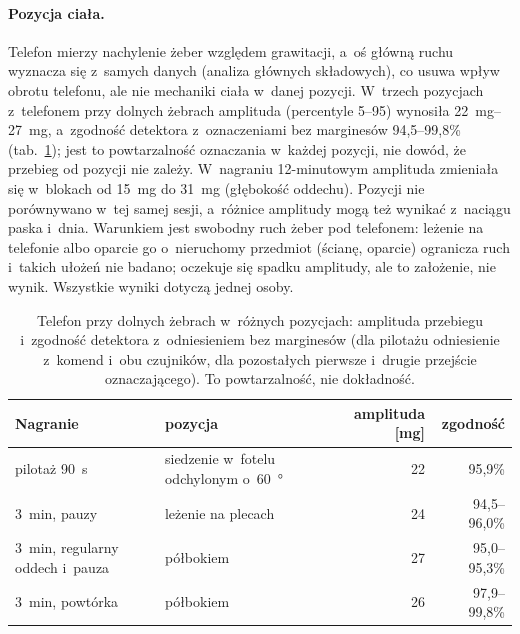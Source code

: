 \documentclass[12pt,a4paper,oneside]{report}
\begin{document}
\paragraph{Pozycja ciała.} Telefon mierzy nachylenie żeber względem grawitacji, a~oś główną ruchu
wyznacza się z~samych danych (analiza głównych składowych), co usuwa wpływ obrotu telefonu, ale nie
mechaniki ciała w~danej pozycji. W~trzech pozycjach z~telefonem przy dolnych żebrach amplituda
(percentyle 5--95) wynosiła \SIrange{22}{27}{mg}, a~zgodność detektora z~oznaczeniami bez marginesów
94,5--99,8\% (tab.~\ref{tab:fazy-pozycje}); jest to powtarzalność oznaczania w~każdej pozycji, nie dowód, że
przebieg od pozycji nie zależy. W~nagraniu 12-minutowym amplituda zmieniała się w~blokach od \SI{15}{mg} do
\SI{31}{mg} (głębokość oddechu). Pozycji nie porównywano w~tej samej sesji, a~różnice amplitudy mogą też
wynikać z~naciągu paska i~dnia. Warunkiem jest swobodny ruch żeber pod telefonem: leżenie na telefonie albo
oparcie go o~nieruchomy przedmiot (ścianę, oparcie) ogranicza ruch i~takich ułożeń nie badano;
oczekuje się spadku amplitudy, ale to założenie, nie wynik. Wszystkie wyniki dotyczą jednej osoby.

\begin{table}[H]
\centering
\small
\caption{Telefon przy dolnych żebrach w~różnych pozycjach: amplituda przebiegu i~zgodność detektora
z~odniesieniem bez marginesów (dla pilotażu odniesienie z~komend i~obu czujników, dla pozostałych
pierwsze i~drugie przejście oznaczającego). To powtarzalność, nie dokładność.}
\label{tab:fazy-pozycje}
\begin{tabular}{@{}p{4.6cm}p{4.4cm}rr@{}}
\toprule
Nagranie & pozycja & amplituda [mg] & zgodność \\
\midrule
pilotaż \SI{90}{s} & siedzenie w~fotelu odchylonym o~\SI{60}{\degree} & 22 & 95,9\% \\
\SI{3}{min}, pauzy & leżenie na plecach & 24 & 94,5--96,0\% \\
\SI{3}{min}, regularny oddech i~pauza & półbokiem & 27 & 95,0--95,3\% \\
\SI{3}{min}, powtórka & półbokiem & 26 & 97,9--99,8\% \\
\bottomrule
\end{tabular}
\end{table}
\end{document}

